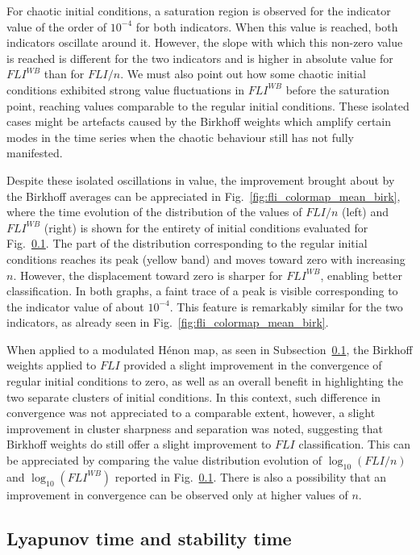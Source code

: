 For chaotic initial conditions, a saturation region is observed for the indicator value of the order of $10^{-4}$ for both indicators. When this value is reached, both indicators oscillate around it. However, the slope with which this non-zero value is reached is different for the two indicators and is higher in absolute value for $FLI^{WB}$ than for $FLI/n$. We must also point out how some chaotic initial conditions exhibited strong value fluctuations in $FLI^{WB}$ before the saturation point, reaching values comparable to the regular initial conditions. These isolated cases might be artefacts caused by the Birkhoff weights which amplify certain modes in the time series when the chaotic behaviour still has not fully manifested.

Despite these isolated oscillations in value, the improvement brought about by the Birkhoff averages can be appreciated in Fig.~\ref{fig:fli_colormap_mean_birk}, where the time evolution of the distribution of the values of $FLI/n$ (left) and $FLI^{WB}$ (right) is shown for the entirety of initial conditions evaluated for Fig.~\ref{}. The part of the distribution corresponding to the regular initial conditions reaches its peak (yellow band) and moves toward zero with increasing $n$. However, the displacement toward zero is sharper for $FLI^{WB}$, enabling better classification. In both graphs, a faint trace of a peak is visible corresponding to the indicator value of about $10^{-4}$. This feature is remarkably similar for the two indicators, as already seen in Fig.~\ref{fig:fli_colormap_mean_birk}.

When applied to a modulated Hénon map, as seen in Subsection~\ref{}, the Birkhoff weights applied to $FLI$ provided a slight improvement in the convergence of regular initial conditions to zero, as well as an overall benefit in highlighting the two separate clusters of initial conditions. In this context, such difference in convergence was not appreciated to a comparable extent, however, a slight improvement in cluster sharpness and separation was noted, suggesting that Birkhoff weights do still offer a slight improvement to $FLI$ classification. This can be appreciated by comparing the value distribution evolution of $\log_{10}(FLI/n)$ and $\log_{10}(FLI^{WB})$ reported in Fig.~\ref{}. There is also a possibility that an improvement in convergence can be observed only at higher values of $n$.

\subsection{Lyapunov time and stability time}

